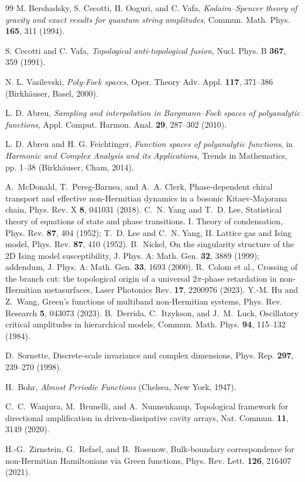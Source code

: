 \documentclass[11pt,a4paper]{article}
\begin{document}
\begin{thebibliography}{99}
M. Bershadsky, S. Cecotti, H. Ooguri, and C. Vafa,
\emph{Kodaira--Spencer theory of gravity and exact results for quantum string amplitudes},
Commun. Math. Phys. \textbf{165}, 311 (1994).

S. Cecotti and C. Vafa,
\emph{Topological anti-topological fusion},
Nucl. Phys. B \textbf{367}, 359 (1991).

N. L. Vasilevski,
\emph{Poly-Fock spaces},
Oper. Theory Adv. Appl. \textbf{117}, 371--386 (Birkh\"auser, Basel, 2000).

L. D. Abreu,
\emph{Sampling and interpolation in Bargmann--Fock spaces of polyanalytic functions},
Appl. Comput. Harmon. Anal. \textbf{29}, 287--302 (2010).

L. D. Abreu and H. G. Feichtinger,
\emph{Function spaces of polyanalytic functions},
in \emph{Harmonic and Complex Analysis and its Applications}, Trends in Mathematics,
pp. 1--38 (Birkh\"auser, Cham, 2014).

 A.~McDonald, T.~Pereg-Barnea, and A.~A. Clerk, Phase-dependent chiral transport and effective non-Hermitian dynamics in a bosonic Kitaev-Majorana chain, Phys. Rev. X \textbf{8}, 041031 (2018).
 C.~N. Yang and T.~D. Lee, Statistical theory of equations of state and phase transitions. I. Theory of condensation, Phys. Rev. \textbf{87}, 404 (1952); T.~D. Lee and C.~N. Yang, II. Lattice gas and Ising model, Phys. Rev. \textbf{87}, 410 (1952).
 B.~Nickel, On the singularity structure of the 2D Ising model susceptibility, J. Phys. A: Math. Gen. \textbf{32}, 3889 (1999); addendum, J. Phys. A: Math. Gen. \textbf{33}, 1693 (2000).
 R.~Colom et al., Crossing of the branch cut: the topological origin of a universal $2\pi$-phase retardation in non-Hermitian metasurfaces, Laser Photonics Rev. \textbf{17}, 2200976 (2023).
 Y.-M. Hu and Z.~Wang, Green's functions of multiband non-Hermitian systems, Phys. Rev. Research \textbf{5}, 043073 (2023).
 B.~Derrida, C.~Itzykson, and J.~M.~Luck,
Oscillatory critical amplitudes in hierarchical models,
Commun. Math. Phys. \textbf{94}, 115--132 (1984).

 D.~Sornette, Discrete-scale invariance and
complex dimensions, Phys. Rep. \textbf{297}, 239--270 (1998).

 H.~Bohr, \emph{Almost Periodic Functions}
(Chelsea, New York, 1947).

 C.~C.~Wanjura, M.~Brunelli, and A.~Nunnenkamp,
Topological framework for directional amplification in driven-dissipative
cavity arrays, Nat. Commun. \textbf{11}, 3149 (2020).

 H.-G.~Zirnstein, G.~Refael, and B.~Rosenow,
Bulk-boundary correspondence for non-Hermitian Hamiltonians via Green
functions, Phys. Rev. Lett. \textbf{126}, 216407 (2021).

\end{thebibliography}
\end{document}
